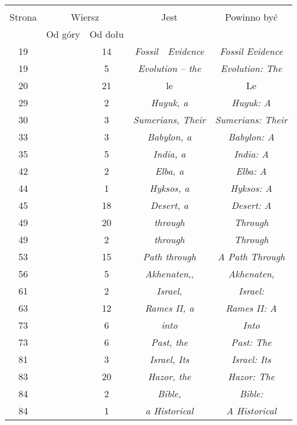 \documentclass[a4paper,11pt]{article}
\begin{document}
\begin{center}
  \begin{tabular}{|c|c|c|c|c|}
    \hline
    & \multicolumn{2}{c|}{} & & \\
    Strona & \multicolumn{2}{c|}{Wiersz} & Jest
                              & Powinno być \\ \cline{2-3}
    & Od góry & Od dołu & & \\
    \hline
    19  & & 14 & \emph{Fossil~~Evidence} & \emph{Fossil Evidence} \\
    19  & &  5 & \emph{Evolution -- the} & \emph{Evolution: The} \\
    20  & & 21 & le & Le \\
    29  & &  2 & \emph{Huyuk, a} & \emph{Huyuk: A} \\
    30  & &  3 & \emph{Sumerians, Their} & \emph{Sumerians: Their} \\
    33  & &  3 & \emph{Babylon, a} & \emph{Babylon: A} \\
    35  & &  5 & \emph{India, a} & \emph{India: A} \\
    42  & &  2 & \emph{Elba, a} & \emph{Elba: A} \\
    44  & &  1 & \emph{Hyksos, a} & \emph{Hyksos: A} \\
    45  & & 18 & \emph{Desert, a} & \emph{Desert: A} \\
    49  & & 20 & \emph{through} & \emph{Through} \\ %
    49  & &  2 & \emph{through} & \emph{Through} \\
    53  & & 15 & \emph{Path through} & \emph{A Path Through} \\
    56  & &  5 & \emph{Akhenaten},,  %
           & \emph{Akhenaten}, \\
    61  & &  2 & \emph{Israel,} & \emph{Israel:} \\
    63  & & 12 & \emph{Rames II, a} & \emph{Rames II: A} \\
    73  & &  6 & \emph{into} & \emph{Into} \\
    73  & &  6 & \emph{Past, the} & \emph{Past: The} \\
    81  & &  3 & \emph{Israel, Its} & \emph{Israel: Its} \\
    83  & & 20 & \emph{Hazor, the} & \emph{Hazor: The} \\
    84  & &  2 & \emph{Bible,} & \emph{Bible:} \\
    84  & &  1 & \emph{a Historical} & \emph{A Historical} \\

\end{tabular}
\end{center}
\end{document}
